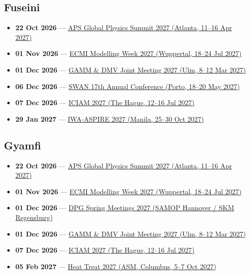 \subsection*{Fuseini}
\begin{itemize}[leftmargin=1.4em,itemsep=0.1em]
  \item \textbf{22 Oct 2026} --- \href{https://summit.aps.org/attend/abstracts}{APS Global Physics Summit 2027 (Atlanta, 11--16 Apr 2027)}
  \item \textbf{01 Nov 2026} --- \href{https://ecmimw.uni-wuppertal.de/en}{ECMI Modelling Week 2027 (Wuppertal, 18--24 Jul 2027)}
  \item \textbf{01 Dec 2026} --- \href{https://jahrestagung.gamm.org/joint-annual-meeting-2027/}{GAMM \& DMV Joint Meeting 2027 (Ulm, 8--12 Mar 2027)}
  \item \textbf{06 Dec 2026} --- \href{https://swan-forum.com/events/swan-2027}{SWAN 17th Annual Conference (Porto, 18--20 May 2027)}
  \item \textbf{07 Dec 2026} --- \href{https://iciam2027.org/}{ICIAM 2027 (The Hague, 12--16 Jul 2027)}
  \item \textbf{29 Jan 2027} --- \href{https://www.iwaaspire2027.org/blank-4}{IWA-ASPIRE 2027 (Manila, 25--30 Oct 2027)}
\end{itemize}

\subsection*{Gyamfi}
\begin{itemize}[leftmargin=1.4em,itemsep=0.1em]
  \item \textbf{22 Oct 2026} --- \href{https://summit.aps.org/attend/abstracts}{APS Global Physics Summit 2027 (Atlanta, 11--16 Apr 2027)}
  \item \textbf{01 Nov 2026} --- \href{https://ecmimw.uni-wuppertal.de/en}{ECMI Modelling Week 2027 (Wuppertal, 18--24 Jul 2027)}
  \item \textbf{01 Dec 2026} --- \href{https://www.dpg-physik.de/aktivitaeten-und-programme/tagungen/fruehjahrstagungen/2027}{DPG Spring Meetings 2027 (SAMOP Hannover / SKM Regensburg)}
  \item \textbf{01 Dec 2026} --- \href{https://jahrestagung.gamm.org/joint-annual-meeting-2027/}{GAMM \& DMV Joint Meeting 2027 (Ulm, 8--12 Mar 2027)}
  \item \textbf{07 Dec 2026} --- \href{https://iciam2027.org/}{ICIAM 2027 (The Hague, 12--16 Jul 2027)}
  \item \textbf{05 Feb 2027} --- \href{https://www.asminternational.org/heat-treat-event/cfp}{Heat Treat 2027 (ASM, Columbus, 5--7 Oct 2027)}
\end{itemize}

